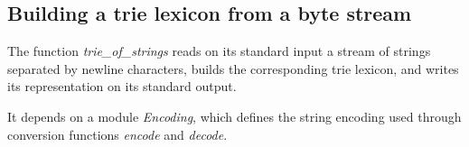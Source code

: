 \subsection{Building a trie lexicon from a byte stream}

The function {\sl trie\_of\_strings} reads on its standard input a stream of
strings separated by newline characters, builds the corresponding
trie lexicon, and writes its representation on its standard output.

It depends on a module {\sl Encoding}, which defines the string
encoding used through conversion functions {\sl encode} and
{\sl decode}.

